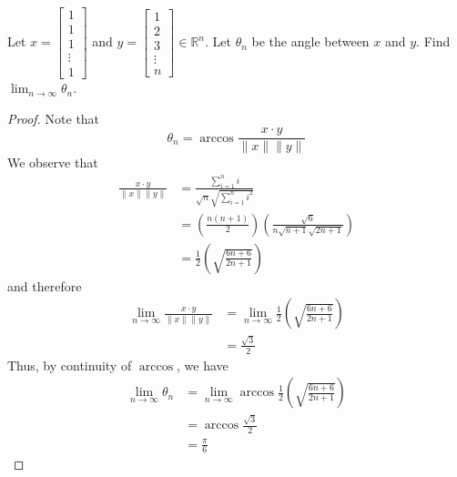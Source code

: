 \begin{exercise} \label{e1.2.8}
    Let \( x = \begin{bmatrix} 1 \\ 1 \\ 1 \\ \vdots \\ 1 \end{bmatrix} \) and \( y = \begin{bmatrix} 1 \\ 2 \\ 3 \\ \vdots \\ n \end{bmatrix} \in \mathbb{R}^n \). Let \( \theta_n \) be the angle between \( x \) and \( y \). Find \( \displaystyle \lim_{n \rightarrow \infty} \theta_n \).
    
    \begin{proof}
        Note that
        \[
        \theta_n = \arccos{\frac{x \cdot y}{\lVert x \rVert \lVert y \rVert}} 
        \]
        We observe that
        \begin{align*}
            \frac{x \cdot y}{\lVert x \rVert \lVert y \rVert} &= \frac{\sum_{i=1}^n i}{\sqrt{n}\sqrt{\sum_{i=1}^n i^2}} \\
            &= \left( \frac{n(n+1)}{2} \right) \left( \frac{\sqrt{6}}{n\sqrt{n+1}\sqrt{2n+1}} \right) \\
            &= \frac{1}{2} \left( \sqrt{\frac{6n+6}{2n+1}} \right)
        \end{align*}
        and therefore
        \begin{align*}
            \lim_{n \rightarrow \infty} \frac{x \cdot y}{\lVert x \rVert \lVert y \rVert} &= \lim_{n \rightarrow \infty} \frac{1}{2} \left( \sqrt{\frac{6n+6}{2n+1}} \right) \\
            &= \frac{\sqrt{3}}{2}
        \end{align*}
        Thus, by continuity of \( \arccos \), we have
        \begin{align*}
            \lim_{n \rightarrow \infty} \theta_n &= \lim_{n \rightarrow \infty} \arccos{\frac{1}{2} \left( \sqrt{\frac{6n+6}{2n+1}} \right)} \\
            &= \arccos{\frac{\sqrt{3}}{2}} \\
            &= \frac{\pi}{6}
        \end{align*}
    \end{proof}
\end{exercise} %


